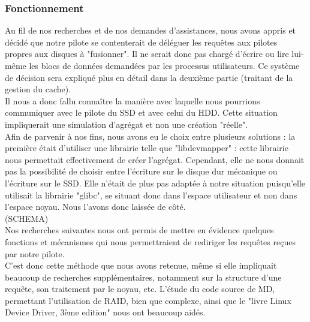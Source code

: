 \documentclass[a4paper,10pt]{article}
\begin{document}
\subsubsection{Fonctionnement}
Au fil de nos recherches et de nos demandes d'assistances, nous avons appris et décidé que notre pilote se contenterait de déléguer les requêtes aux pilotes
propres aux disques à "fusionner". Il ne serait donc pas chargé d'écrire ou lire lui-même les blocs de données demandées par les processus utilisateurs. Ce 
système de décision sera expliqué plus en détail dans la deuxième partie (traitant de la gestion du cache).\medskip\\
Il nous a donc fallu connaître la manière avec laquelle nous pourrions communiquer avec le pilote du SSD et avec celui du HDD. Cette situation impliquerait 
une simulation d'agrégat et non une création "réelle".\medskip\\
Afin de parvenir à nos fins, nous avons eu le choix entre plusieurs solutions : la première était d'utiliser une librairie telle que "libdevmapper" : cette 
librairie nous permettait effectivement de créer l'agrégat. Cependant, elle ne nous donnait pas la possibilité de choisir entre l'écriture sur le disque dur 
mécanique ou l'écriture sur le SSD. Elle n'était de plus pas adaptée à notre situation puisqu'elle utilisait la librairie "glibc", se situant donc dans 
l'espace utilisateur et non dans l'espace noyau. Nous l'avons donc laissée de côté.\\
(SCHEMA)
\bigskip\\
Nos recherches suivantes nous ont permis de mettre en évidence quelques fonctions et mécanismes qui nous permettraient de rediriger les requêtes reçues par 
notre pilote. \medskip\\
C'est donc cette méthode que nous avons retenue, même si elle impliquait beaucoup de recherches supplémentaires, notamment sur la structure d'une requête, 
son traitement par le noyau, etc. L'étude du code source de MD, permettant l'utilisation de RAID, bien que complexe, ainsi que le "livre Linux Device Driver, 
3ème edition" nous ont beaucoup aidés.
\end{document}
